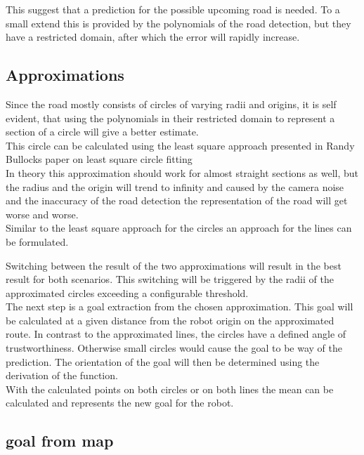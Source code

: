 This suggest that a prediction for the possible upcoming road is needed. To a small extend this is provided by the polynomials of the road detection, but they have a restricted domain, after which the error will rapidly increase.

\subsection{Approximations}

Since the road mostly consists of circles of varying radii and origins, it is self evident, that using the polynomials in their restricted domain to represent a section of a circle will give a better estimate.\\
This circle can be calculated using the least square approach presented in Randy Bullocks paper on least square circle fitting \cite{leastsquarecircle}\\

In theory this approximation should work for almost straight sections as well, but the radius and the origin will trend to infinity and caused by the camera noise and the inaccuracy of the road detection the representation of the road will get worse and worse.\\

Similar to the least square approach for the circles an approach for the lines can be formulated.

Switching between the result of the two approximations will result in the best result for both scenarios. This switching will be triggered by the radii of the approximated circles exceeding a configurable threshold.\\

The next step is a goal extraction from the chosen approximation. This goal will be calculated at a given distance from the robot origin on the approximated route. In contrast to the approximated lines, the circles have a defined angle of trustworthiness. Otherwise small circles would cause the goal to be way of the prediction. The orientation of the goal will then be determined using the derivation of the function.\\

With the calculated points on both circles or on both lines the mean can be calculated and represents the new goal for the robot.

\subsection{goal from map}

